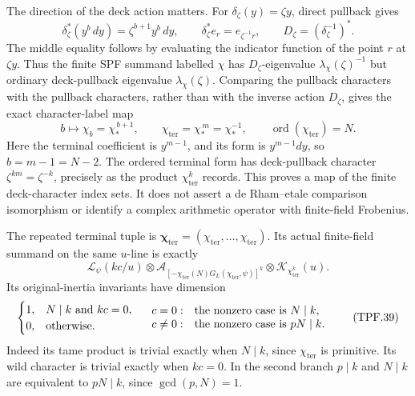 The direction of the deck action matters. For
\(\delta_\zeta(y)=\zeta y\), direct pullback gives
\[
 \delta_\zeta^*(y^b\,dy)=\zeta^{b+1}y^b\,dy,\qquad
 \delta_\zeta^*e_r=e_{\zeta^{-1}r},\qquad
 D_\zeta=(\delta_\zeta^{-1})^* .
 \tag{TPF.36}\label{CFStage:eq:TPF36}
\]
The middle equality follows by evaluating the
indicator function of the point \(r\) at \(\zeta y\).
Thus the finite SPF summand labelled \(\chi\) has
\(D_\zeta\)-eigenvalue \(\lambda_\chi(\zeta)^{-1}\)
but ordinary deck-pullback eigenvalue
\(\lambda_\chi(\zeta)\). Comparing the pullback
characters with the pullback characters, rather
than with the inverse action \(D_\zeta\), gives
the exact character-label map
\[
 b\longmapsto\chi_b=\chi_*^{\,b+1},\qquad
 \chi_{\mathrm{ter}}=\chi_*^{\,m}
                  =\chi_*^{-1},\qquad
 \operatorname{ord}(\chi_{\mathrm{ter}})=N .
 \tag{TPF.37}\label{CFStage:eq:TPF37}
\]
Here the terminal coefficient is \(y^{m-1}\), and
its form is \(y^{m-1}dy\), so \(b=m-1=N-2\).
The ordered terminal form has deck-pullback character
\(\zeta^{km}=\zeta^{-k}\), precisely as the product
\(\chi_{\mathrm{ter}}^k\) records.
This proves a map of the finite deck-character
index sets. It does not assert a de Rham--etale
comparison isomorphism or identify a complex
arithmetic operator with finite-field Frobenius.

The repeated terminal tuple is
\(\boldsymbol\chi_{\mathrm{ter}}
=(\chi_{\mathrm{ter}},\ldots,\chi_{\mathrm{ter}})\).
Its actual finite-field summand on the same
\(u\)-line is exactly
\[
 \mathcal L_\psi(kc/u)\otimes
 \mathcal A_{\left[-\chi_{\mathrm{ter}}(N)
                    G_L(\chi_{\mathrm{ter}},\psi)\right]^k}
                  \otimes\mathcal K_{\chi_{\mathrm{ter}}^k}(u).
 \tag{TPF.38}\label{CFStage:eq:TPF38}
\]
Its original-inertia invariants have dimension
\[
 \begin{cases}
 1,&N\mid k\ \hbox{and }kc=0,\\
 0,&\hbox{otherwise}.
 \end{cases}
 \quad
 \begin{array}{ll}
 c=0:&\text{the nonzero case is }N\mid k,\\
 c\ne0:&\text{the nonzero case is }pN\mid k.
 \end{array}
 \tag{TPF.39}\label{CFStage:eq:TPF39}
\]
Indeed its tame product is trivial exactly when
\(N\mid k\), since \(\chi_{\mathrm{ter}}\) is primitive.
Its wild character is trivial exactly when \(kc=0\).
In the second branch \(p\mid k\) and \(N\mid k\)
are equivalent to \(pN\mid k\), since \(\gcd(p,N)=1\).

